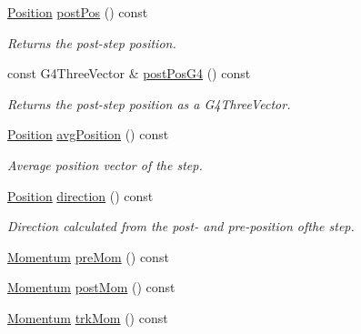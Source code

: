 \begin{DoxyCompactItemize}
\hyperlink{namespace_d_d4hep_1_1_geometry_a55083902099d03506c6db01b80404900}{Position} \hyperlink{class_d_d4hep_1_1_simulation_1_1_geant4_step_handler_a41172681a0ca6e6aa21e99df5af11be3}{post\+Pos} () const
\begin{DoxyCompactList}\small\item\em Returns the post-\/step position. \end{DoxyCompactList}\item 
const G4\+Three\+Vector \& \hyperlink{class_d_d4hep_1_1_simulation_1_1_geant4_step_handler_a8724fb0d717e73716f12a30a851a6b3f}{post\+Pos\+G4} () const
\begin{DoxyCompactList}\small\item\em Returns the post-\/step position as a G4\+Three\+Vector. \end{DoxyCompactList}\item 
\hyperlink{namespace_d_d4hep_1_1_geometry_a55083902099d03506c6db01b80404900}{Position} \hyperlink{class_d_d4hep_1_1_simulation_1_1_geant4_step_handler_a876eeb25864f93069d4bd2227d64d598}{avg\+Position} () const
\begin{DoxyCompactList}\small\item\em Average position vector of the step. \end{DoxyCompactList}\item 
\hyperlink{namespace_d_d4hep_1_1_geometry_a55083902099d03506c6db01b80404900}{Position} \hyperlink{class_d_d4hep_1_1_simulation_1_1_geant4_step_handler_a14b596b04db07b10254b26148e28fcb9}{direction} () const
\begin{DoxyCompactList}\small\item\em Direction calculated from the post-\/ and pre-\/position ofthe step. \end{DoxyCompactList}\item 
\hyperlink{namespace_d_d4hep_1_1_simulation_aead01eb580dc503a5abba194d179c963}{Momentum} \hyperlink{class_d_d4hep_1_1_simulation_1_1_geant4_step_handler_ac04cff5a17eae75d0ce7ff1e496e5885}{pre\+Mom} () const
\item 
\hyperlink{namespace_d_d4hep_1_1_simulation_aead01eb580dc503a5abba194d179c963}{Momentum} \hyperlink{class_d_d4hep_1_1_simulation_1_1_geant4_step_handler_a076e5f37eebfe47622756fe81069ee89}{post\+Mom} () const
\item 
\hyperlink{namespace_d_d4hep_1_1_simulation_aead01eb580dc503a5abba194d179c963}{Momentum} \hyperlink{class_d_d4hep_1_1_simulation_1_1_geant4_step_handler_a28d90fb5cec49ff63a1741526a1e4d02}{trk\+Mom} () const
\item 

\end{DoxyCompactItemize}
